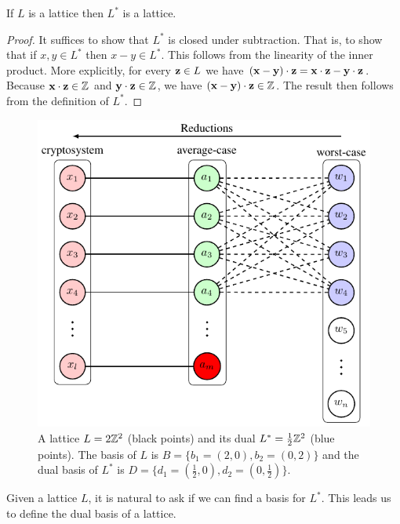 \documentclass[../main.tex]{subfiles}
\begin{document}
\begin{proposition}
If $L$ is a lattice then $L^*$ is a lattice.
\end{proposition}
\begin{proof}
It suffices to show that $L^*$ is closed under subtraction.  That is, to show that if $x,y \in L^*$ then $x-y \in L^*$. This follows from the linearity of the inner product. More explicitly, for every $\mathbf{z} \in L$ we have $(\mathbf{x}-\mathbf{y})\cdot \mathbf{z} = \mathbf{x}\cdot \mathbf{z} - \mathbf{y} \cdot \mathbf{z}$. Because $\mathbf{x}\cdot \mathbf{z} \in \mathbb{Z}$ and $\mathbf{y} \cdot \mathbf{z} \in \mathbb{Z}$, we have $(\mathbf{x}-\mathbf{y})\cdot \mathbf{z} \in \mathbb{Z}$. The result then follows from the definition of $L^*$.
\end{proof}
\begin{figure}[hbt!]
	\centering
	\includegraphics[page=4]{images/Lattice_crypto_tikz_folder.pdf}
	\caption{A lattice $L=2\mathbb{Z}^2$ (black points) and its dual $L^*=\frac{1}{2}\mathbb{Z}^2$ (blue points). The basis of $L$ is $B=\{b_1=(2,0),b_2=(0,2)\}$ and the dual basis of $L^*$ is $D=\{d_1=(\frac{1}{2},0),d_2=(0,\frac{1}{2})\}$.}
	\label{fig:dualLat}
\end{figure}

Given a lattice $L$, it is natural to ask if we can find a basis for $L^*$. This leads us to define the dual basis of a lattice.
\end{document}
